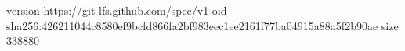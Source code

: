 version https://git-lfs.github.com/spec/v1
oid sha256:426211044c8580ef9bcfd866fa2bf983eec1ee2161f77ba04915a88a5f2b90ae
size 338880
